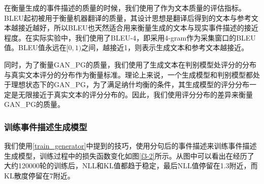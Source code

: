 在衡量生成的事件描述的质量的时候，我们使用了\cite{papineni_bleu:_2002}作为文本质量的评估指标。BLEU起初被用于衡量机器翻译的质量，其设计思想是翻译后得到的文本与参考文本越接近越好，所以BLEU也天然适合用来衡量生成的文本与现实事件描述的接近程度。在实际实验中，我们使用了BLEU-4，即采用4-gram作为采集窗口的BLEU值。BLEU值永远在$[0,1)$之间，越接近1，则表示生成文本和参考文本越接近。

同时，为了衡量GAN\_PG的质量，我们使用了生成文本在判别模型处评分的分布与真实文本评分的分布作为衡量标准。理论上来说，一个生成模型和判别模型都处于理想状态下的GAN\_PG，为了满足纳什均衡的条件，其生成模型的评分分布一定是无限接近于真实文本的评分分布的。因此，我们使用评分分布的差异来衡量GAN\_PG的质量。

\subsubsection{训练事件描述生成模型}
我们使用\ref{train_generator}中提到的技巧，使用分句后的事件描述来训练事件描述生成模型，训练过程中的损失函数变化如图\ref{f3-2}所示。从图中可以看出在经历了大约120000轮的训练后，NLL和KL值都趋于稳定，最后NLL值停留在1.3附近，而KL散度停留在7附近。
